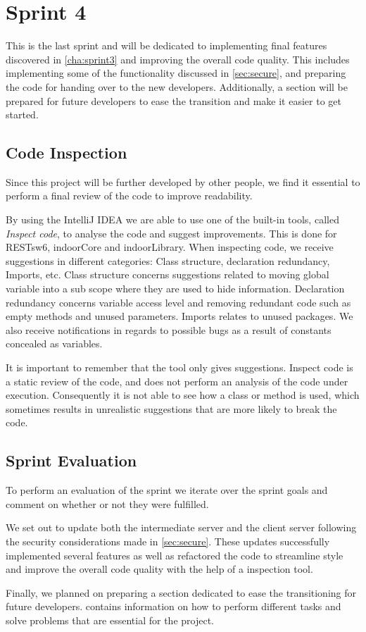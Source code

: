 \chapter{Sprint 4}
This is the last sprint and will be dedicated to implementing final features discovered in \cref{cha:sprint3} and improving the overall code quality. This includes implementing some of the functionality discussed in \cref{sec:secure}, and preparing the code for handing over to the new developers. Additionally, a section will be prepared for future developers to ease the transition and make it easier to get started.






\section{Code Inspection}
Since this project will be further developed by other people, we find it essential to perform a final review of the code to improve readability.

By using the IntelliJ IDEA we are able to use one of the built-in tools, called \emph{Inspect code}, to analyse the code and suggest improvements. This is done for RESTsw6, indoorCore and indoorLibrary. When inspecting code, we receive suggestions in different categories: Class structure, declaration redundancy, Imports, etc. Class structure concerns suggestions related to moving global variable into a sub scope where they are used to hide information. Declaration redundancy concerns variable access level and removing redundant code such as empty methods and unused parameters. Imports relates to unused packages. We also receive notifications in regards to possible bugs as a result of constants concealed as variables.

It is important to remember that the tool only gives suggestions. Inspect code is a static review of the code, and does not perform an analysis of the code under execution. Consequently it is not able to see how a class or method is used, which sometimes results in unrealistic suggestions that are more likely to break the code.

\section{Sprint Evaluation}
To perform an evaluation of the sprint we iterate over the sprint goals and comment on whether or not they were fulfilled.

We set out to update both the intermediate server and the client server following the security considerations made in \cref{sec:secure}. These updates successfully implemented several features as well as refactored the code to streamline style and improve the overall code quality with the help of a inspection tool.

Finally, we planned on preparing a section dedicated to ease the transitioning for future developers.  contains information on how to perform different tasks and solve problems that are essential for the project.
